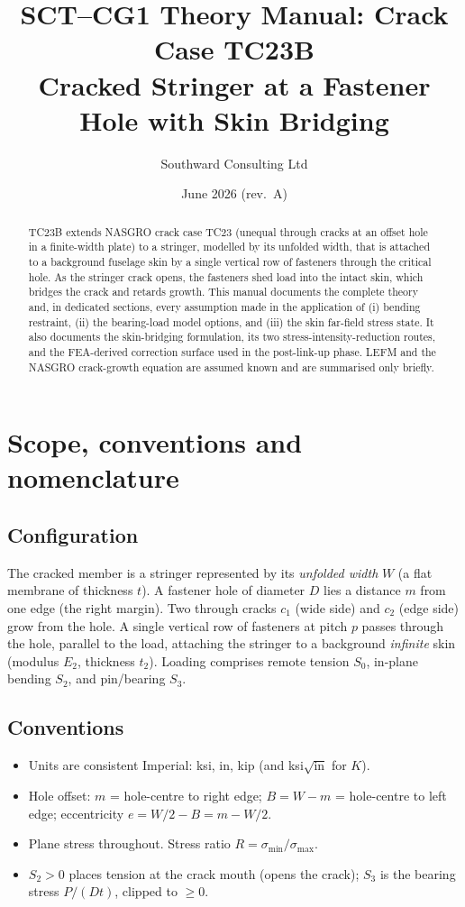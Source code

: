 \documentclass[11pt]{article}
\title{\textbf{SCT--CG1 Theory Manual: Crack Case TC23B}\\[4pt]
\large Cracked Stringer at a Fastener Hole with Skin Bridging}
\author{Southward Consulting Ltd}
\date{June 2026 \quad(rev.\ A)}
\begin{document}
\maketitle

\begin{abstract}
TC23B extends NASGRO crack case TC23 (unequal through cracks at an offset hole
in a finite-width plate) to a stringer, modelled by its unfolded width, that is
attached to a background fuselage skin by a single vertical row of fasteners
through the critical hole. As the stringer crack opens, the fasteners shed load
into the intact skin, which bridges the crack and retards growth. This manual
documents the complete theory and, in dedicated sections, every assumption made
in the application of (i) bending restraint, (ii) the bearing-load model
options, and (iii) the skin far-field stress state. It also documents the
skin-bridging formulation, its two stress-intensity-reduction routes, and the
FEA-derived correction surface used in the post-link-up phase. LEFM and the
NASGRO crack-growth equation are assumed known and are summarised only briefly.
\end{abstract}

\tableofcontents

\section{Scope, conventions and nomenclature}

\subsection{Configuration}
The cracked member is a stringer represented by its \emph{unfolded width} $W$
(a flat membrane of thickness $t$). A fastener hole of diameter $D$ lies a
distance $m$ from one edge (the right margin). Two through cracks $c_1$ (wide
side) and $c_2$ (edge side) grow from the hole. A single vertical row of
fasteners at pitch $p$ passes through the hole, parallel to the load, attaching
the stringer to a background \emph{infinite} skin (modulus $E_2$, thickness
$t_2$). Loading comprises remote tension $S_0$, in-plane bending $S_2$, and
pin/bearing $S_3$.

\subsection{Conventions}
\begin{itemize}[leftmargin=1.5em,topsep=2pt,itemsep=1pt]
\item Units are consistent Imperial: ksi, in, kip (and ksi$\sqrt{\text{in}}$ for $K$).
\item Hole offset: $m$ = hole-centre to right edge; $B = W-m$ = hole-centre to
  left edge; eccentricity $e = W/2 - B = m - W/2$.
\item Plane stress throughout. Stress ratio $R = \sigma_{\min}/\sigma_{\max}$.
\item $S_2>0$ places tension at the crack mouth (opens the crack); $S_3$ is the
  bearing stress $P/(Dt)$, clipped to $\ge 0$.
\end{itemize}
\end{document}
